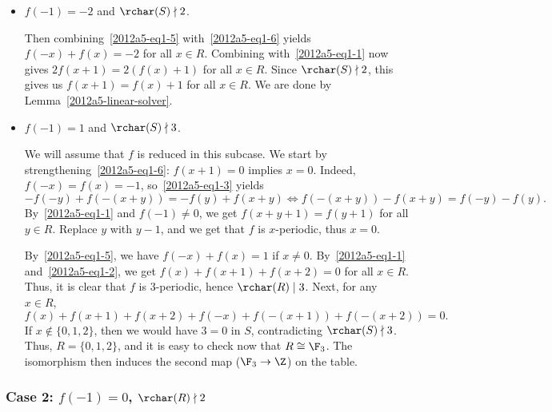 \begin{itemize}

    \item
    $f(-1) = -2$ and $\rchar(S) \nmid 2$.
    
    Then combining~\eqref{2012a5-eq1-5} with~\eqref{2012a5-eq1-6} yields $f(-x) + f(x) = -2$ for all $x \in R$.
    Combining with~\eqref{2012a5-eq1-1} now gives $2 f(x + 1) = 2 (f(x) + 1)$ for all $x \in R$.
    Since $\rchar(S) \nmid 2$, this gives us $f(x + 1) = f(x) + 1$ for all $x \in R$.
    We are done by Lemma~\ref{2012a5-linear-solver}.


    \item
    $f(-1) = 1$ and $\rchar(S) \nmid 3$.

    We will assume that $f$ is reduced in this subcase.
    We start by strengthening~\eqref{2012a5-eq1-6}: $f(x + 1) = 0$ implies $x = 0$.
    Indeed, $f(-x) = f(x) = -1$, so~\eqref{2012a5-eq1-3} yields
    \[ -f(-y) + f(-(x + y)) = -f(y) + f(x + y) \iff f(-(x + y)) - f(x + y) = f(-y) - f(y). \]
    By~\eqref{2012a5-eq1-1} and $f(-1) \neq 0$, we get $f(x + y + 1) = f(y + 1)$ for all $y \in R$.
    Replace $y$ with $y - 1$, and we get that $f$ is $x$-periodic, thus $x = 0$.

    By~\eqref{2012a5-eq1-5}, we have $f(-x) + f(x) = 1$ if $x \neq 0$.
    By~\eqref{2012a5-eq1-1} and~\eqref{2012a5-eq1-2}, we get $f(x) + f(x + 1) + f(x + 2) = 0$ for all $x \in R$.
    Thus, it is clear that $f$ is $3$-periodic, hence $\rchar(R) \mid 3$.
    Next, for any $x \in R$,
    \[ f(x) + f(x + 1) + f(x + 2) + f(-x) + f(-(x + 1)) + f(-(x + 2)) = 0. \]
    If $x \notin \{0, 1, 2\}$, then we would have $3 = 0$ in $S$, contradicting $\rchar(S) \nmid 3$.
    Thus, $R = \{0, 1, 2\}$, and it is easy to check now that $R \cong \F_3$.
    The isomorphism then induces the second map ($\F_3 \to \Z$) on the table.

\end{itemize}




\newpage
\subsubsection*{Case 2: $f(-1) = 0$, $\rchar(R) \nmid 2$}

\iffalse
Plugging $y = -1$ into~\eqref{2012a5-eq0} immediately implies that $f$ is even.
In particular, by replacing $y$ with $-y$ in~\eqref{2012a5-eq0} yields
\[ f(xy - 1) = f(x) f(y) + f(x - y). \tag{2.1}\label{2012a5-eq2-1} \]
Applying~\eqref{2012a5-eq0} and the above equation to $f(2x + 1) = f(2(x + 1) - 1)$ yields
\[ f(x) f(2) + f(x + 2) = f(x + 1) f(2) + f(x - 1). \tag{2.2}\label{2012a5-eq2-2} \]
\fi

